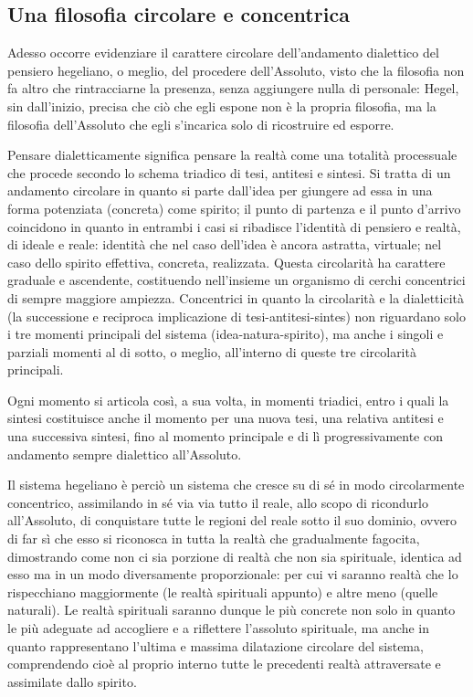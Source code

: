 \documentclass[a4paper,12pt,oneside,openany]{book}%
\begin{document}
\subsection*{Una filosofia circolare e concentrica}

Adesso occorre evidenziare il carattere circolare dell’andamento dialettico del pensiero hegeliano, o meglio, del procedere dell’Assoluto, visto che la filosofia non fa altro che rintracciarne la presenza, senza aggiungere nulla di personale: Hegel, sin dall’inizio, precisa che ciò che egli espone non è la propria filosofia, ma la filosofia dell’Assoluto che egli s’incarica solo di ricostruire ed esporre.

Pensare dialetticamente significa pensare la realtà come una totalità processuale che procede secondo lo schema triadico di tesi, antitesi e sintesi. Si tratta di un andamento circolare in quanto si parte dall’idea per giungere ad essa in una forma potenziata (concreta) come spirito; il punto di partenza e il punto d’arrivo coincidono in quanto in entrambi i casi si ribadisce l’identità di pensiero e realtà, di ideale e reale: identità che nel caso dell’idea è ancora astratta, virtuale; nel caso dello spirito effettiva, concreta, realizzata. Questa circolarità ha carattere graduale e ascendente, costituendo nell’insieme un organismo di cerchi concentrici di sempre maggiore ampiezza. Concentrici in quanto la circolarità e la dialetticità (la successione e reciproca implicazione di tesi-antitesi-sintes) non riguardano solo i tre momenti principali del sistema (idea-natura-spirito), ma anche i singoli e parziali momenti al di sotto, o meglio, all’interno di queste tre circolarità principali.

Ogni momento si articola così, a sua volta, in momenti triadici, entro i quali la sintesi costituisce anche il momento per una nuova tesi, una relativa antitesi e una successiva sintesi, fino al momento principale e di lì progressivamente con andamento sempre dialettico all’Assoluto.

Il sistema hegeliano è perciò un sistema che cresce su di sé in modo circolarmente concentrico, assimilando in sé via via tutto il reale, allo scopo di ricondurlo all’Assoluto, di conquistare tutte le regioni del reale sotto il suo dominio, ovvero di far sì che esso si riconosca in tutta la realtà che gradualmente fagocita, dimostrando come non ci sia porzione di realtà che non sia spirituale, identica ad esso ma in un modo diversamente proporzionale: per cui vi saranno realtà che lo rispecchiano maggiormente (le realtà spirituali appunto) e altre meno (quelle naturali). Le realtà spirituali saranno dunque le più concrete non solo in quanto le più adeguate ad accogliere e a riflettere l’assoluto spirituale, ma anche in quanto rappresentano l’ultima e massima dilatazione circolare del sistema, comprendendo cioè al proprio interno tutte le precedenti realtà attraversate e assimilate dallo spirito.
\end{document}
